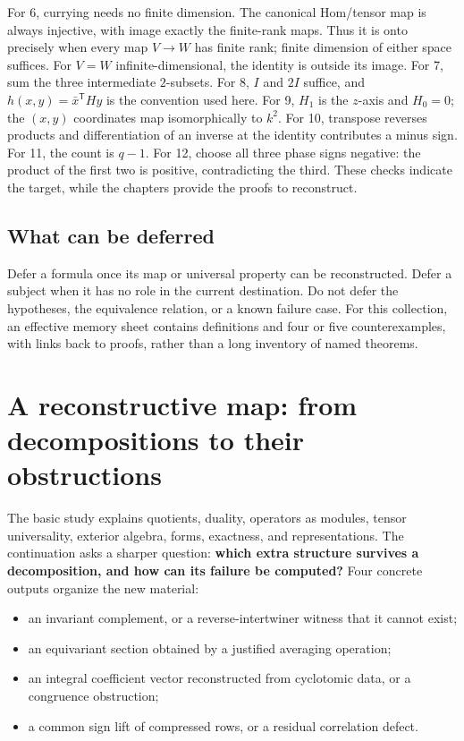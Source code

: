 \documentclass[
  11pt,
]{article}
\providecommand{\tightlist}{%
  \setlength{\itemsep}{0pt}\setlength{\parskip}{0pt}}
\begin{document}
For 6, currying needs no finite dimension. The canonical Hom/tensor map
is always injective, with image exactly the finite-rank maps. Thus it is
onto precisely when every map \(V\to W\) has finite rank; finite
dimension of either space suffices. For \(V=W\) infinite-dimensional,
the identity is outside its image. For 7, sum the three intermediate
\(2\)-subsets. For 8, \(I\) and \(2I\) suffice, and
\(h(x,y)=\bar x^{\mathsf T}Hy\) is the convention used here. For 9,
\(H_1\) is the \(z\)-axis and \(H_0=0\); the \((x,y)\) coordinates map
isomorphically to \(k^2\). For 10, transpose reverses products and
differentiation of an inverse at the identity contributes a minus sign.
For 11, the count is \(q-1\). For 12, choose all three phase signs
negative: the product of the first two is positive, contradicting the
third. These checks indicate the target, while the chapters provide the
proofs to reconstruct.

\subsection*{What can be deferred}\label{what-can-be-deferred}

Defer a formula once its map or universal property can be reconstructed.
Defer a subject when it has no role in the current destination. Do not
defer the hypotheses, the equivalence relation, or a known failure case.
For this collection, an effective memory sheet contains definitions and
four or five counterexamples, with links back to proofs, rather than a
long inventory of named theorems.

\section*{A reconstructive map: from decompositions to their
obstructions}\label{a-reconstructive-map-from-decompositions-to-their-obstructions}

The basic study explains quotients, duality, operators as modules,
tensor universality, exterior algebra, forms, exactness, and
representations. The continuation asks a sharper question: \textbf{which
extra structure survives a decomposition, and how can its failure be
computed?} Four concrete outputs organize the new material:

\begin{itemize}
\tightlist
\item
  an invariant complement, or a reverse-intertwiner witness that it
  cannot exist;
\item
  an equivariant section obtained by a justified averaging operation;
\item
  an integral coefficient vector reconstructed from cyclotomic data, or
  a congruence obstruction;
\item
  a common sign lift of compressed rows, or a residual correlation
  defect.
\end{itemize}
\end{document}
